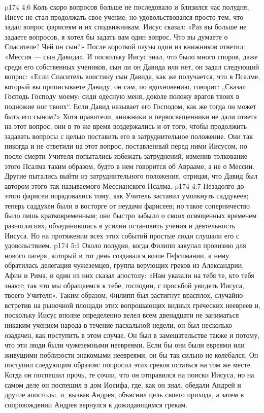 \vs p174 4:6 Коль скоро вопросов больше не последовало и близился час полудня, Иисус не стал продолжать свое учение, но удовольствовался просто тем, что задал вопрос фарисеям и их сподвижникам. Иисус сказал: «Раз вы больше не задаете вопросов, я хотел бы задать вам один вопрос. Что вы думаете о Спасителе? Чей он сын?» После короткой паузы один из книжников ответил: «Мессия --- сын Давида». И поскольку Иисус знал, что было много споров, даже среди его собственных учеников, сын ли он Давида или нет, он задал следующий вопрос: «Если Спаситель воистину сын Давида, как же получается, что в Псалме, который вы приписываете Давиду, он сам, по вдохновению, говорит: „Сказал Господь Господу моему: сиди одесную меня, доколе положу врагов твоих в подножие ног твоих“. Если Давид называет его Господом, как же тогда он может быть его сыном?» Хотя правители, книжники и первосвященники не дали ответа на этот вопрос, они в то же время воздержались и от того, чтобы продолжить задавать вопросы с целью поставить его в затруднительное положение. Они так никогда и не ответили на этот вопрос, поставленный перед ними Иисусом, но после смерти Учителя попытались избежать затруднений, изменив толкование этого Псалма таким образом, будто в нем говорится об Аврааме, а не о Мессии. Другие пытались выйти из затруднительного положения, отрицая, что Давид был автором этого так называемого Мессианского Псалма.
\vs p174 4:7 Незадолго до этого фарисеи порадовались тому, как Учитель заставил умолкнуть саддукеев; теперь саддукеи были в восторге от неудачи фарисеев; но такое соперничество было лишь кратковременным; они быстро забыли о своих освященных временем разногласиях, объединившись в усилии остановить учения и деятельность Иисуса. Но на протяжении всех этих событий простые люди слушали его с удовольствием.
\vs p174 5:1 Около полудня, когда Филипп закупал провизию для нового лагеря, который в тот день создавался возле Гефсимании, к нему обратилась делегация чужеземцев, группа верующих греков из Александрии, Афин и Рима, и один из них сказал апостолу: «Нам указали на тебя те, кто тебя знают; так что мы обращаемся к тебе, господин, с просьбой увидеть Иисуса, твоего Учителя». Таким образом, Филипп был застигнут врасплох, случайно встретив на рыночной площади этих вопрошающих видных греческих неевреев и, поскольку Иисус вполне определенно велел всем двенадцати не заниматься никаким учением народа в течение пасхальной недели, он был несколько озадачен, как поступить в этом случае. Он был в замешательстве также и потому, что эти люди были чужеземными неевреями. Если бы они были евреями или живущими поблизости знакомыми неевреями, он бы так сильно не колебался. Он поступил следующим образом: попросил этих греков остаться на том же месте. Когда он поспешил прочь, те сочли, что он отправился на поиски Иисуса, но на самом деле он поспешил в дом Иосифа, где, как он знал, обедали Андрей и другие апостолы, и, вызвав Андрея, объяснил цель своего прихода, а затем в сопровождении Андрея вернулся к дожидающимся грекам.
